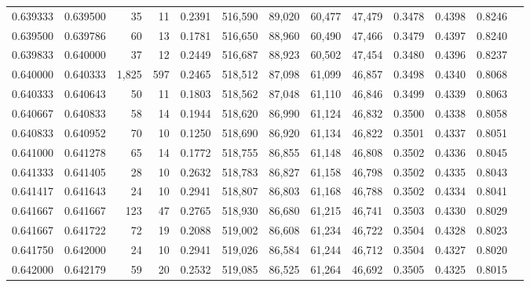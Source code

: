 \begin{tabular}{rrrrrrrrrrrrr}
0.639333 & 0.639500 &    35 &  11 &                                     0.2391 & 516,590 &  89,020 &  60,477 &  47,479 & 0.3478 & 0.4398 & 0.8246 \\
0.639500 & 0.639786 &    60 &  13 &                                     0.1781 & 516,650 &  88,960 &  60,490 &  47,466 & 0.3479 & 0.4397 & 0.8240 \\
0.639833 & 0.640000 &    37 &  12 &                                     0.2449 & 516,687 &  88,923 &  60,502 &  47,454 & 0.3480 & 0.4396 & 0.8237 \\
0.640000 & 0.640333 & 1,825 & 597 &                                     0.2465 & 518,512 &  87,098 &  61,099 &  46,857 & 0.3498 & 0.4340 & 0.8068 \\
0.640333 & 0.640643 &    50 &  11 &                                     0.1803 & 518,562 &  87,048 &  61,110 &  46,846 & 0.3499 & 0.4339 & 0.8063 \\
0.640667 & 0.640833 &    58 &  14 &                                     0.1944 & 518,620 &  86,990 &  61,124 &  46,832 & 0.3500 & 0.4338 & 0.8058 \\
0.640833 & 0.640952 &    70 &  10 &                                     0.1250 & 518,690 &  86,920 &  61,134 &  46,822 & 0.3501 & 0.4337 & 0.8051 \\
0.641000 & 0.641278 &    65 &  14 &                                     0.1772 & 518,755 &  86,855 &  61,148 &  46,808 & 0.3502 & 0.4336 & 0.8045 \\
0.641333 & 0.641405 &    28 &  10 &                                     0.2632 & 518,783 &  86,827 &  61,158 &  46,798 & 0.3502 & 0.4335 & 0.8043 \\
0.641417 & 0.641643 &    24 &  10 &                                     0.2941 & 518,807 &  86,803 &  61,168 &  46,788 & 0.3502 & 0.4334 & 0.8041 \\
0.641667 & 0.641667 &   123 &  47 &                                     0.2765 & 518,930 &  86,680 &  61,215 &  46,741 & 0.3503 & 0.4330 & 0.8029 \\
0.641667 & 0.641722 &    72 &  19 &                                     0.2088 & 519,002 &  86,608 &  61,234 &  46,722 & 0.3504 & 0.4328 & 0.8023 \\
0.641750 & 0.642000 &    24 &  10 &                                     0.2941 & 519,026 &  86,584 &  61,244 &  46,712 & 0.3504 & 0.4327 & 0.8020 \\
0.642000 & 0.642179 &    59 &  20 &                                     0.2532 & 519,085 &  86,525 &  61,264 &  46,692 & 0.3505 & 0.4325 & 0.8015 \\

\end{tabular}
